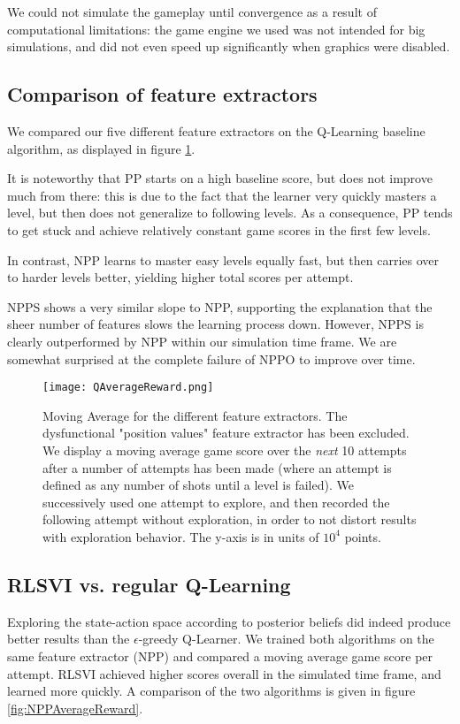 \documentclass[fleqn,10pt]{SelfArx} %
\begin{document}
We could not simulate the gameplay until convergence as a result of computational limitations: the game engine we used was not intended for big simulations, and did not even speed up significantly when graphics were disabled.


\subsection{Comparison of feature extractors}
We compared our five different feature extractors on the Q-Learning baseline algorithm, as displayed in figure \ref{fig:QAverageReward}.

It is noteworthy that PP starts on a high baseline score, but does not improve much from there: this is due to the fact that the learner very quickly masters a level, but then does not generalize to following levels. As a consequence, PP tends to get stuck and achieve relatively constant game scores in the first few levels.

In contrast, NPP learns to master easy levels equally fast, but then carries over to harder levels better, yielding higher total scores per attempt. 

NPPS shows a very similar slope to NPP, supporting the explanation that the sheer number of features slows the learning process down. However, NPPS is clearly outperformed by NPP within our simulation time frame. We are somewhat surprised at the complete failure of NPPO to improve over time.

\begin{figure}[ht]\centering
\texttt{[image: QAverageReward.png]}
\caption{Moving Average for the different feature extractors. The dysfunctional "position values" feature extractor has been excluded. We display a moving average game score over the \emph{next} 10 attempts after a number of attempts has been made (where an attempt is defined as any number of shots until a level is failed). We successively used one attempt to explore, and then recorded the following attempt without exploration, in order to not distort results with exploration behavior. The y-axis is in units of $10^4$ points.}
\label{fig:QAverageReward}
\end{figure}


\subsection{RLSVI vs. regular Q-Learning}

Exploring the state-action space according to posterior beliefs did indeed produce better results than the $\epsilon$-greedy Q-Learner. We trained both algorithms on the same feature extractor (NPP) and compared a moving average game score per attempt. RLSVI achieved higher scores overall in the simulated time frame, and learned more quickly. A comparison of the two algorithms is given in figure \ref{fig:NPPAverageReward}.
\end{document}
